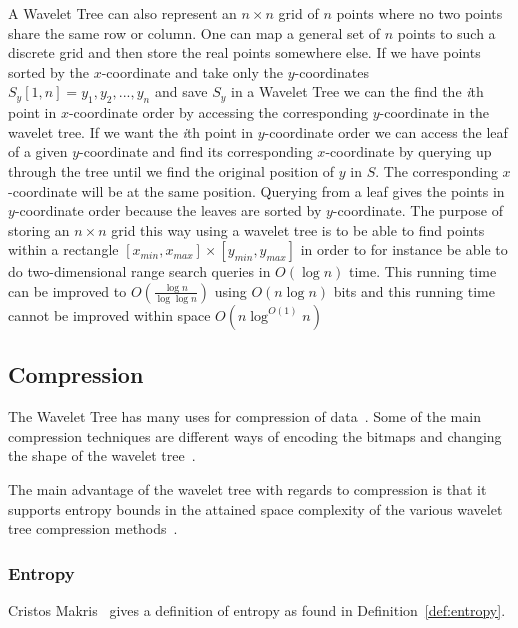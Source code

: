 A Wavelet Tree can also represent an $n \times n$ grid of $n$ points where no two points share the same row or column. 
One can map a general set of $n$ points to such a discrete grid and then store the real points somewhere else. If we have points sorted by the $x$-coordinate and take only the $y$-coordinates $S_y[1,n] = y_1,y_2,...,y_n$ and save $S_y$ in a Wavelet Tree we can the find the \textit{i}th point in $x$-coordinate order by accessing the corresponding $y$-coordinate in the wavelet tree. 
If we want the \textit{i}th point in $y$-coordinate order we can access the leaf of a given $y$-coordinate and find its corresponding $x$-coordinate by querying up through the tree until we find the original position of $y$ in $S$. 
The corresponding $x$-coordinate will be at the same position.
Querying from a leaf gives the points in $y$-coordinate order because the leaves are sorted by $y$-coordinate.
The purpose of storing an $n \times n$ grid this way using a wavelet tree is to be able to find points within a rectangle $[ x_{min}, x_{max} ] \times [ y_{min}, y_{max} ]$ in order to for instance be able to do two-dimensional range search queries in $O(\log n)$ time.
This running time can be improved to $O(\frac{\log n}{\log \log n})$ using $O(n \log n)$ bits and this running time cannot be improved within space $O(n \log^{O(1)} n)$~

\subsection{Compression}
The Wavelet Tree has many uses for compression of data~.
Some of the main compression techniques are different ways of encoding the bitmaps and changing the shape of the wavelet tree~.

The main advantage of the wavelet tree with regards to compression is that it supports entropy bounds in the attained space complexity of the various wavelet tree compression methods~.

\subsubsection{Entropy}
\label{sec:entropy}
Cristos Makris~ gives a definition of entropy as found in Definition~\ref{def:entropy}.

